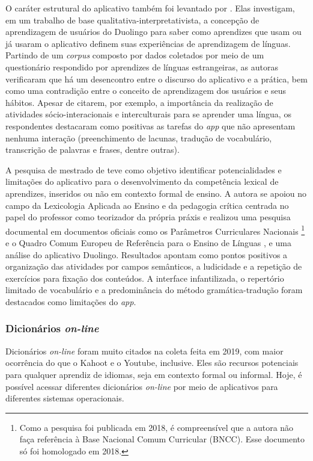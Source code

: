 \documentclass[portuguese]{textolivre}
\begin{document}
O caráter estrutural do aplicativo também foi levantado por \textcite{marques-schafer_concepcoes_2018}. Elas investigam, em um trabalho de base qualitativa-interpretativista, a concepção de aprendizagem de usuários do Duolingo para saber como aprendizes que usam ou já usaram o aplicativo definem suas experiências de aprendizagem de línguas. Partindo de um \textit{corpus} composto por dados coletados por meio de um questionário respondido por aprendizes de línguas estrangeiras, as autoras verificaram que há um desencontro entre o discurso do aplicativo e a prática, bem como uma contradição entre o conceito de aprendizagem dos usuários e seus hábitos. Apesar de citarem, por exemplo, a importância da realização de atividades sócio-interacionais e interculturais para se aprender uma língua, os respondentes destacaram como positivas as tarefas do \textit{app} que não apresentam nenhuma interação (preenchimento de lacunas, tradução de vocabulário, transcrição de palavras e frases, dentre outras).

A pesquisa de mestrado de \textcite{honorato_duolingo_2018} teve como objetivo identificar potencialidades e limitações do aplicativo para o desenvolvimento da competência lexical de aprendizes, inseridos ou não em contexto formal de ensino. A autora se apoiou no campo da Lexicologia Aplicada ao Ensino e da pedagogia crítica centrada no papel do professor como teorizador da própria práxis e realizou uma pesquisa documental em documentos oficiais como os Parâmetros Curriculares Nacionais \cite{brasil_parametros_2000}\footnote{Como a pesquisa foi publicada em 2018, é compreensível que a autora não faça referência à Base Nacional Comum Curricular (BNCC). Esse documento só foi homologado em 2018.} e o Quadro Comum Europeu de Referência para o Ensino de Línguas \cite{conselho_da_europa_quadro_2001}, e uma análise do aplicativo Duolingo. Resultados apontam como pontos positivos a organização das atividades por campos semânticos, a ludicidade e a repetição de exercícios para fixação dos conteúdos. A interface infantilizada, o repertório limitado de vocabulário e a predominância do método gramática-tradução foram destacados como limitações do \textit{app}.

\subsubsection{Dicionários \textit{on-line}}\label{sec-organizacao-latex}
Dicionários \textit{on-line} foram muito citados na coleta feita em 2019, com maior ocorrência do que o Kahoot e o Youtube, inclusive. Eles são recursos potenciais para qualquer aprendiz de idiomas, seja em contexto formal ou informal. Hoje, é possível acessar diferentes dicionários \textit{on-line} por meio de aplicativos para diferentes sistemas operacionais.
\end{document}
